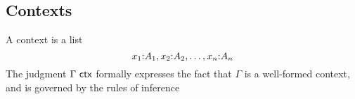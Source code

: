 \documentclass[hott-all.tex]{subfiles}
\begin{document}
\subsection{Contexts}
\label{subsec:contexts}
%
A context is a list
\begin{equation*}
  x_1 \mathord{:} A_1, x_2 \mathord{:} A_2, \ldots, x_n \mathord{:} A_n
\end{equation*}
%
%
The judgment $\Gamma\ \mathsf{ctx}$ formally expresses the fact that $\Gamma$ is a well-formed context, and is governed by the rules of inference
%
%
%
\end{document}
